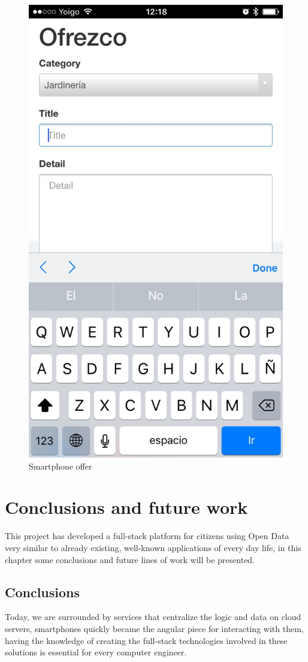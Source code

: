 \documentclass{DeustoFDP}
\begin{document}
\begin{figure}[h!]
\centering
\includegraphics[width=0.7\linewidth]{fig/Manual/mobileoffer}
\caption[Smartphone offer]{Smartphone offer}
\label{fig:mobileoffer}
\end{figure}

\chapter{Conclusions and future work}\label{cha:conclusions}
This project has developed a full-stack platform for citizens using Open Data very similar to already existing, well-known applications of every day life, in this chapter some conclusions and future lines of work will be presented.

\section{Conclusions}
Today, we are surrounded by services that centralize the logic and data on cloud servers, smartphones quickly became the angular piece for interacting with them, having the knowledge of creating the full-stack technologies involved in these solutions is essential for every computer engineer.
\end{document}
